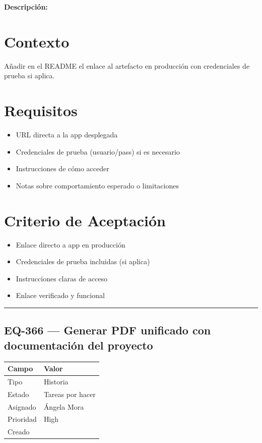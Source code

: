 \documentclass[
  spanish,
  11pt,
]{report}
\newcounter{none} %
\providecommand{\tightlist}{%
  \setlength{\itemsep}{0pt}\setlength{\parskip}{0pt}}
\begin{document}
\textbf{Descripción:}

\section{Contexto}\label{contexto-3}

Añadir en el README el enlace al artefacto en producción con
credenciales de prueba si aplica.

\section{Requisitos}\label{requisitos-2}

\begin{itemize}
\tightlist
\item
  URL directa a la app desplegada
\item
  Credenciales de prueba (usuario/pass) si es necesario
\item
  Instrucciones de cómo acceder
\item
  Notas sobre comportamiento esperado o limitaciones
\end{itemize}

\section{Criterio de Aceptación}\label{criterio-de-aceptaciuxf3n-2}

\begin{itemize}
\tightlist
\item[$\square$]
  Enlace directo a app en producción
\item[$\square$]
  Credenciales de prueba incluidas (si aplica)
\item[$\square$]
  Instrucciones claras de acceso
\item[$\square$]
  Enlace verificado y funcional
\end{itemize}

\begin{center}\rule{0.5\linewidth}{0.5pt}\end{center}

\subsection{EQ-366 --- Generar PDF unificado con documentación del
proyecto}\label{eq-366-generar-pdf-unificado-con-documentaciuxf3n-del-proyecto}

{\def\LTcaptype{none} %
\begin{longtable}[]{@{}ll@{}}
\toprule\noalign{}
Campo & Valor \\
\midrule\noalign{}
\endhead
\bottomrule\noalign{}
\endlastfoot
Tipo & Historia \\
Estado & Tareas por hacer \\
Asignado & Ángela Mora \\
Prioridad & High \\
Creado & \\
\end{longtable}
}
\end{document}
